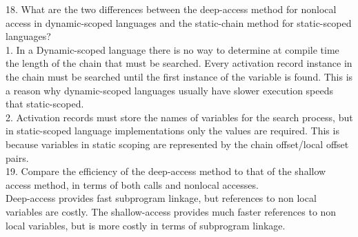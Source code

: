 \documentclass{article}
\begin{document}
18. What are the two differences between the deep-access method for nonlocal access in dynamic-scoped languages and the static-chain method for static-scoped languages? \\

1. In a Dynamic-scoped language there is no way to determine at compile time the length of the chain that must be searched. Every activation record instance in the chain must be searched until the first instance of the variable is found. This is a reason why dynamic-scoped languages usually have slower execution speeds that static-scoped.\\
2. Activation records must store the names of variables for the search process, but in static-scoped language implementations only the values are required. This is because variables in static scoping are represented by the chain offset/local offset pairs.\\

19. Compare the efficiency of the deep-access method to that of the shallow access method, in terms of both calls and nonlocal accesses. \\

Deep-access provides fast subprogram linkage, but references to non local variables are costly. The shallow-access provides much faster references to non local variables, but is more costly in terms of subprogram linkage.
\end{document}
